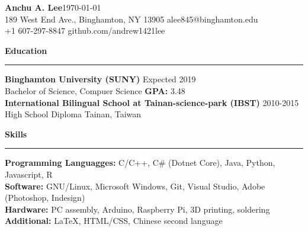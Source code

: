 \documentclass[11pt]{article}
\newcommand{\Hrule}{\vspace{1mm}\hrule\vspace{1mm}}
\begin{document}
    \noindent\Large\textbf{Anchu A. Lee}\hfill \small\today\\
    \noindent\small{189 West End Ave., Binghamton, NY 13905} \hfill \small{alee845@binghamton.edu}\\
    \noindent\small{+1 607-297-8847}\hfill\small{ github.com/andrew1421lee}
    \vspace{2mm}

    \noindent\large\textbf{Education}
    \Hrule
        \indent \small\textbf{Binghamton University (SUNY)} \hfill \small{Expected 2019}\indent\\
            \indent\indent\small{Bachelor of Science, Compuer Science \textbar \textbf{ GPA:} 3.48}\vspace{1mm}\\
        \indent \small\textbf{International Bilingual School at Tainan-science-park (IBST)} \hfill \small{2010-2015}\indent\\
            \indent\indent \small{High School Diploma } \hfill \small{Tainan, Taiwan}\indent\vspace{1mm}

    \noindent\large\textbf{Skills}
    \Hrule
        \indent \small\textbf{Programming Languagges: }\small{C/C++, C\# (Dotnet Core), Java, Python, Javascript, R}\vspace{0.5mm} \\
        \indent \small\textbf{Software: }\small{GNU/Linux, Microsoft Windows, Git, Visual Studio, Adobe (Photoshop, Indesign)}\vspace{0.5mm}\\
        \indent \small\textbf{Hardware: }\small{PC assembly, Arduino, Raspberry Pi, 3D printing, soldering}\vspace{0.5mm}\\
        \indent \small\textbf{Additional: }\small{LaTeX, HTML/CSS, Chinese second language}\vspace{1mm}
\end{document}
